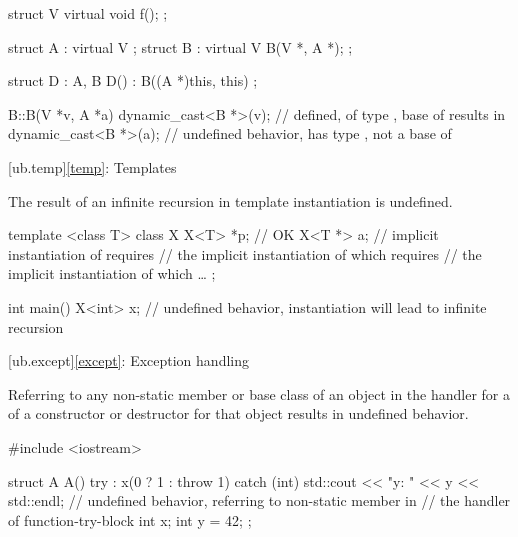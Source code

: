 \pnum
\begin{example}
\begin{codeblock}
struct V {
  virtual void f();
};

struct A : virtual V {};
struct B : virtual V {
  B(V *, A *);
};

struct D : A, B {
  D() : B((A *)this, this) {}
};

B::B(V *v, A *a) {
  dynamic_cast<B *>(v);         // defined,  of type ,  base of  results in 
  dynamic_cast<B *>(a);         // undefined behavior,  has type ,  not a base of 
}
\end{codeblock}
\end{example}

[ub.temp]{\ref*{temp}: Templates}


\pnum
The result of an infinite recursion in template instantiation is undefined.

\pnum
\begin{example}
\begin{codeblock}
template <class T>
class X {
  X<T> *p;      // OK
  X<T *> a;     // implicit instantiation of  requires
                // the implicit instantiation of  which requires
                // the implicit instantiation of  which \ldots
};

int main() {
  X<int> x;     // undefined behavior, instantiation will lead to infinite recursion
}
\end{codeblock}
\end{example}

[ub.except]{\ref*{except}: Exception handling}


\pnum
Referring to any non-static member or base class of an object
in the handler for a 
of a constructor or destructor for that object
results in undefined behavior.

\pnum
\begin{example}
\begin{codeblock}
#include <iostream>

struct A {
  A() try : x(0 ? 1 : throw 1) {
  } catch (int) {
    std::cout << "y: " << y << std::endl;   // undefined behavior, referring to non-static member  in
                                            // the handler of function-try-block
  }
  int x;
  int y = 42;
};
\end{codeblock}
\end{example}
